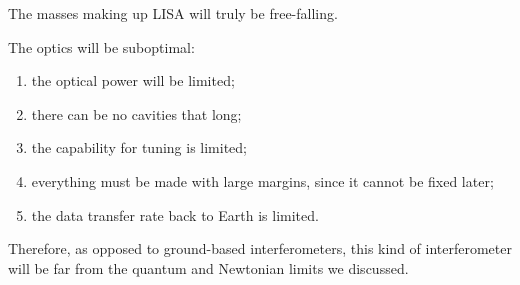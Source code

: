 \documentclass[main.tex]{subfiles}
\begin{document}
The masses making up LISA will truly be free-falling. 

The optics will be suboptimal: 
\begin{enumerate}
    \item the optical power will be limited;
    \item there can be no cavities that long;
    \item the capability for tuning is limited;
    \item everything must be made with large margins, since it cannot be fixed later;
    \item the data transfer rate back to Earth is limited.
\end{enumerate}

Therefore, as opposed to ground-based interferometers, this kind of interferometer will be far from the quantum and Newtonian limits we discussed.



\end{document}
